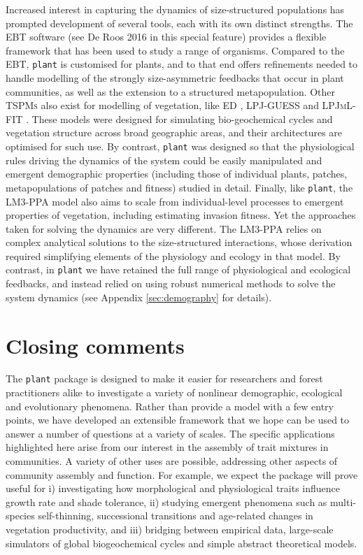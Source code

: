 \documentclass[a4paper,11pt]{article}
\newcommand{\plant}{\texttt{plant}}
\begin{document}
Increased interest in capturing the dynamics of size-structured populations
has prompted development of several tools, each with its own distinct
strengths. The \textsc{EBT} software (see De Roos 2016 in this special feature) provides
a flexible framework that has been used to study a range of organisms.
Compared to the \textsc{EBT}, {\plant} is customised for plants, and
to that end offers refinements needed to handle modelling of the strongly
size-asymmetric feedbacks that occur in plant communities, as well as the
extension to a structured metapopulation. Other \textsc{TSPMs} also exist for modelling of vegetation, like \textsc{ED}
\citep[ver 1 and 2;][]{Moorcroft-2001, Medvigy-2009}, \textsc {LPJ-GUESS}
\citep{Smith-2014} and \textsc{LPJmL-FIT} \citep{Sakschewski-2015}. These
models were designed for simulating bio-geochemical cycles and vegetation
structure across broad geographic areas, and their architectures are
optimised for such use. By contrast, {\plant} was designed so that the
physiological rules driving the dynamics of the system could be easily
manipulated and emergent demographic properties (including those of individual plants, patches, metapopulations of patches and fitness) studied in
detail. Finally, like {\plant}, the \textsc{LM3-PPA} \cite{Weng-2015} model also aims
to scale from individual-level processes to emergent properties of
vegetation, including estimating invasion fitness. Yet the approaches taken
for solving the dynamics are very different. The \textsc{LM3-PPA} relies on
complex analytical solutions to the size-structured interactions, whose
derivation required simplifying elements of the physiology and ecology in that
model. By contrast, in {\plant} we have retained the full range of
physiological and ecological feedbacks, and instead relied on using robust
numerical methods to solve the system dynamics (see Appendix
\ref{sec:demography} for details).

\section{Closing comments}

The {\plant} package is designed to make it easier for researchers and forest
practitioners alike to investigate a variety of nonlinear demographic, ecological and evolutionary
phenomena. Rather than provide a model with a few entry points, we
have developed an extensible framework that we hope can be used to
answer a number of questions at a variety of scales. The specific
applications highlighted here arise from our interest in the assembly of
trait mixtures in communities. A variety of other uses are
possible, addressing other aspects of community assembly and function. For
example, we expect the package will prove useful for i) investigating
how morphological and physiological traits influence growth rate and
shade tolerance, ii) studying emergent phenomena such as multi-species self-thinning, successional transitions and age-related changes in
vegetation productivity, and iii) bridging between empirical data,
large-scale simulators of global biogeochemical cycles and simple
abstract theoretical models.
\end{document}
